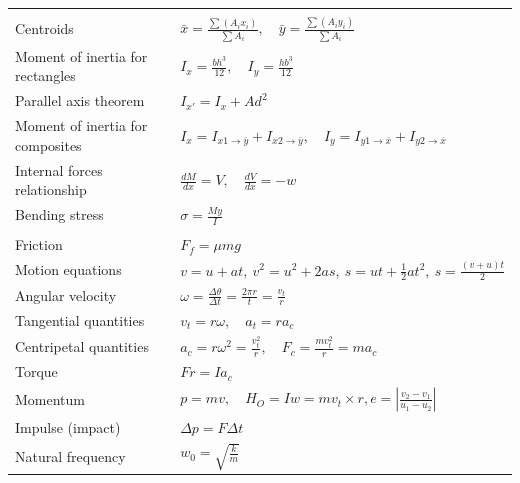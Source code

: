 \begin{tabular}{|l|l|}
    &\\
    Centroids                         & $\bar{x}=\frac{\sum (A_i x_i)}{\sum A_i},\quad \bar{y}=\frac{\sum (A_i y_i)}{\sum A_i}$ \\
    Moment of inertia for rectangles  & $I_x=\frac{bh^3}{12},\quad I_y=\frac{hb^3}{12}$                                         \\
    Parallel axis theorem             & $I_{x'}=I_{x}+Ad^2$                                                                     \\
    Moment of inertia for composites  & $I_x=I_{x1\to\bar{y}} + I_{x2\to\bar{y}},\quad I_y=I_{y1\to\bar{x}} + I_{y2\to\bar{x}}$ \\
    Internal forces relationship      & $\frac{dM}{dx}=V,\quad \frac{dV}{dx}=-w$                                                \\
    Bending stress                    & $\sigma=\frac{My}{I}$                                                                   \\
    &\\
    Friction                          & $F_f=\mu mg$                                                                            \\
    Motion equations                  & $v=u+at,\ v^2=u^2+2as,\ s=ut+\frac{1}{2}at^2,\ s=\frac{(v+u)t}{2}$                      \\
    Angular velocity                  & $\omega = \frac{\Delta\theta}{\Delta t}=\frac{2\pi r}{t} = \frac{v_t}{r}$               \\
    Tangential quantities             & $v_t = r\omega,\quad a_t = r a_c$                                                       \\
    Centripetal quantities            & $a_c = r\omega^2 = \frac{v_t^2}{r},\quad F_c = \frac{mv_t^2}{r} = ma_c$                 \\
    Torque                            & $Fr = Ia_c$                                                                             \\
    Momentum                          & $p=mv, \quad H_O=Iw=mv_t\times r,e=|\frac{v_{2}-v_{1}}{u_{1}-u_{2}}|$                   \\
    Impulse (impact)                  & $\Delta p=F\Delta t$                                                                    \\
    Natural frequency                 & $w_0=\sqrt{\frac{k}{m}}$                                                                \\

\end{tabular}
